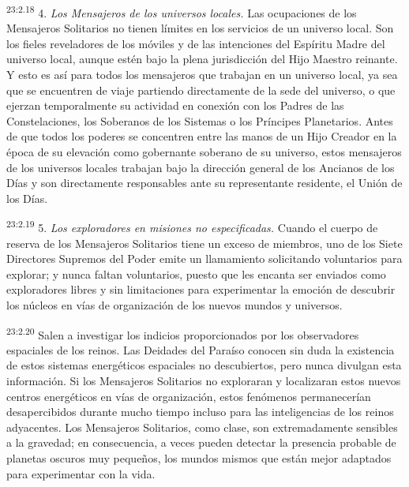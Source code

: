 \par
\textsuperscript{23:2.18} 4. \textit{Los Mensajeros de los universos locales.} Las ocupaciones de los Mensajeros Solitarios no tienen límites en los servicios de un universo local. Son los fieles reveladores de los móviles y de las intenciones del Espíritu Madre del universo local, aunque estén bajo la plena jurisdicción del Hijo Maestro reinante. Y esto es así para todos los mensajeros que trabajan en un universo local, ya sea que se encuentren de viaje partiendo directamente de la sede del universo, o que ejerzan temporalmente su actividad en conexión con los Padres de las Constelaciones, los Soberanos de los Sistemas o los Príncipes Planetarios. Antes de que todos los poderes se concentren entre las manos de un Hijo Creador en la época de su elevación como gobernante soberano de su universo, estos mensajeros de los universos locales trabajan bajo la dirección general de los Ancianos de los Días y son directamente responsables ante su representante residente, el Unión de los Días.

\par
\textsuperscript{23:2.19} 5. \textit{Los exploradores en misiones no especificadas.} Cuando el cuerpo de reserva de los Mensajeros Solitarios tiene un exceso de miembros, uno de los Siete Directores Supremos del Poder emite un llamamiento solicitando voluntarios para explorar; y nunca faltan voluntarios, puesto que les encanta ser enviados como exploradores libres y sin limitaciones para experimentar la emoción de descubrir los núcleos en vías de organización de los nuevos mundos y universos.

\par
\textsuperscript{23:2.20} Salen a investigar los indicios proporcionados por los observadores espaciales de los reinos. Las Deidades del Paraíso conocen sin duda la existencia de estos sistemas energéticos espaciales no descubiertos, pero nunca divulgan esta información. Si los Mensajeros Solitarios no exploraran y localizaran estos nuevos centros energéticos en vías de organización, estos fenómenos permanecerían desapercibidos durante mucho tiempo incluso para las inteligencias de los reinos adyacentes. Los Mensajeros Solitarios, como clase, son extremadamente sensibles a la gravedad; en consecuencia, a veces pueden detectar la presencia probable de planetas oscuros muy pequeños, los mundos mismos que están mejor adaptados para experimentar con la vida.


